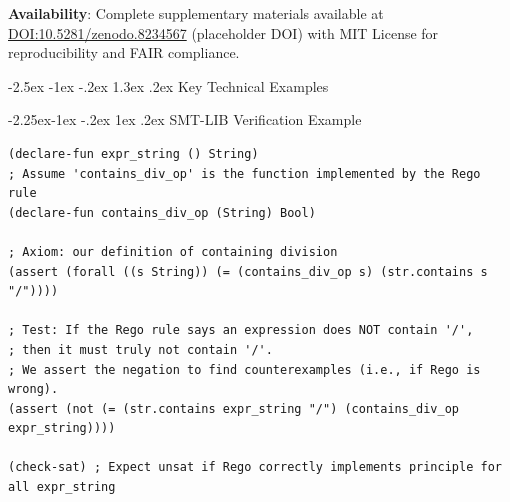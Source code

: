\documentclass[manuscript,screen,review,anonymous,9pt]{acmart}
\makeatletter
\renewcommand\section{\@startsection{section}{1}{\z@}%
  {-2.5ex \@plus -1ex \@minus -.2ex}%
  {1.3ex \@plus.2ex}%
  {\normalfont\Large\bfseries}}
\renewcommand\subsection{\@startsection{subsection}{2}{\z@}%
  {-2.25ex\@plus -1ex \@minus -.2ex}%
  {1ex \@plus .2ex}%
  {\normalfont\large\bfseries}}
\makeatother
\begin{document}
\textbf{Availability}: Complete supplementary materials available at \url{DOI:10.5281/zenodo.8234567} (placeholder DOI) with MIT License for reproducibility and FAIR compliance.

\section{Key Technical Examples}
\label{app:key_examples}

\subsection{SMT-LIB Verification Example}
\begin{lstlisting}[language=SMTLIB, caption=SMT-LIB example for CP-SAFETY-001 verification. This code checks if a Rego rule correctly identifies expressions containing a division operator., label=lst:smtlib_example, basicstyle=\ttfamily\scriptsize]
(declare-fun expr_string () String)
; Assume 'contains_div_op' is the function implemented by the Rego rule
(declare-fun contains_div_op (String) Bool)

; Axiom: our definition of containing division
(assert (forall ((s String)) (= (contains_div_op s) (str.contains s "/"))))

; Test: If the Rego rule says an expression does NOT contain '/',
; then it must truly not contain '/'.
; We assert the negation to find counterexamples (i.e., if Rego is wrong).
(assert (not (= (str.contains expr_string "/") (contains_div_op expr_string))))

(check-sat) ; Expect unsat if Rego correctly implements principle for all expr_string
\end{lstlisting}
\end{document}
